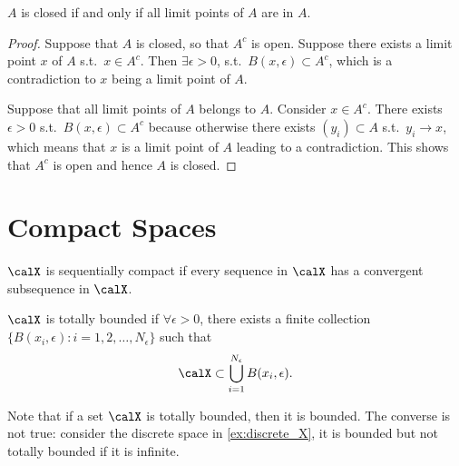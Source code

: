 \documentclass[../aipt.tex]{subfiles}
\begin{document}
\begin{Lemma}\label{lem:closed}
$A$ is closed if and only if all limit points of $A$ are in $A$.
\end{Lemma}
\begin{proof}
Suppose that $A$ is closed, so that $A^c$ is open. Suppose there exists a limit point $x$ of $A$ s.t.\ $x \in A^c$. Then $\exists \epsilon >0$, s.t.\ $B(x,\epsilon) \subset A^c$, which is a contradiction to $x$ being a limit point of $A$.

Suppose that all limit points of $A$ belongs to $A$. Consider $x\in A^c$. There exists $\epsilon>0$ s.t.\ $B(x,\epsilon)\subset A^c$ because otherwise there exists $(y_i)\subset A$ s.t.\ $y_i\to x$, which means that $x$ is a limit point of $A$ leading to a contradiction. This shows that $A^c$ is open and hence $A$ is closed.
\end{proof}

\section{Compact Spaces}

\begin{Definition}
$\calX$ is sequentially compact if every sequence in $\calX$ has a convergent subsequence in $\calX$.
\end{Definition}

\begin{Definition}
$\calX$ is totally bounded if $\forall \epsilon>0$, there exists a finite collection $\{ B(x_i,\epsilon) : i=1,2,\ldots,N_{\epsilon}\}$ such that  
\begin{align*}
\calX \subset \bigcup_{i=1}^{N_{\epsilon}}B(x_i,\epsilon).
\end{align*}
\end{Definition}

Note that if a set $\calX$ is totally bounded, then it is bounded. The converse is not true: consider the discrete space in \cref{ex:discrete_X}, it is bounded but not totally bounded if it is infinite.
\end{document}
